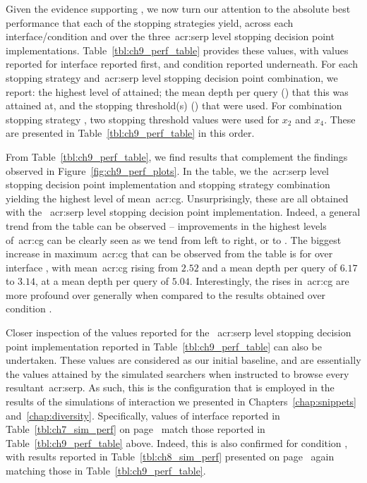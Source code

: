 Given the evidence supporting , we now turn our attention to the absolute best performance that each of the stopping strategies yield, across each interface/condition and over the three~\gls{acr:serp} level stopping decision point implementations. Table~\ref{tbl:ch9_perf_table} provides these values, with values reported for interface  reported first, and condition  reported underneath. For each stopping strategy and~\gls{acr:serp} level stopping decision point combination, we report: the highest level of  attained; the mean depth per query () that this was attained at, and the stopping threshold(s) () that were used. For combination stopping strategy , two stopping threshold values were used for $x_2$ and $x_4$. These are presented in Table~\ref{tbl:ch9_perf_table} in this order.

From Table~\ref{tbl:ch9_perf_table}, we find results that complement the findings observed in Figure~\ref{fig:ch9_perf_plots}. In the table, we  the~\gls{acr:serp} level stopping decision point implementation and stopping strategy combination yielding the highest level of mean~\gls{acr:cg}. Unsurprisingly, these are all obtained with the ~\gls{acr:serp} level stopping decision point implementation. Indeed, a general trend from the table can be observed -- improvements in the highest levels of~\gls{acr:cg} can be clearly seen as we tend from left to right, or  to . The biggest increase in maximum~\gls{acr:cg} that can be observed from the table is for  over interface , with mean~\gls{acr:cg} rising from $2.52$ and a mean depth per query of $6.17$ to $3.14$, at a mean depth per query of $5.04$. Interestingly, the rises in~\gls{acr:cg} are more profound over  generally when compared to the results obtained over condition .

Closer inspection of the values reported for the ~\gls{acr:serp} level stopping decision point implementation reported in Table~\ref{tbl:ch9_perf_table} can also be undertaken. These values are considered as our initial baseline, and are essentially the values attained by the simulated searchers when instructed to browse every resultant~\gls{acr:serp}. As such, this is the configuration that is employed in the results of the simulations of interaction we presented in Chapters~\ref{chap:snippets} and~\ref{chap:diversity}. Specifically, values of interface  reported in Table~\ref{tbl:ch7_sim_perf} on page~\pageref{tbl:ch7_sim_perf} match those reported in Table~\ref{tbl:ch9_perf_table} above. Indeed, this is also confirmed for condition , with results reported in Table~\ref{tbl:ch8_sim_perf} presented on page~\pageref{tbl:ch8_sim_perf} again matching those in Table~\ref{tbl:ch9_perf_table}.

